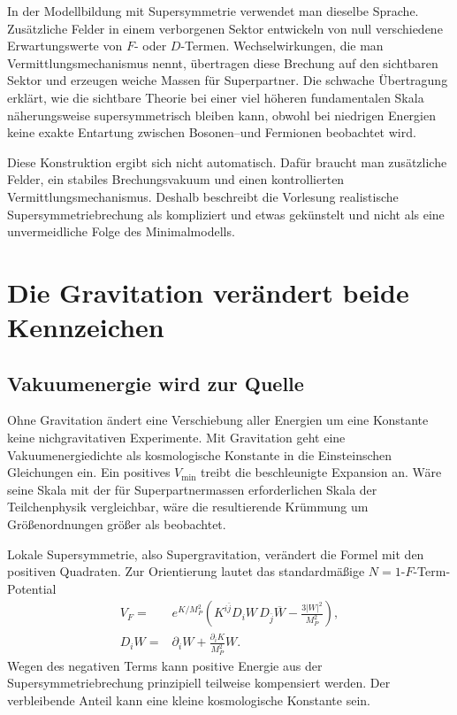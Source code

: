 In der Modellbildung mit Supersymmetrie verwendet man dieselbe Sprache. Zusätzliche Felder in einem verborgenen Sektor entwickeln von null verschiedene Erwartungswerte von \(F\)- oder \(D\)-Termen. Wechselwirkungen, die man Vermittlungsmechanismus nennt, übertragen diese Brechung auf den sichtbaren Sektor und erzeugen weiche Massen für Superpartner. Die schwache Übertragung erklärt, wie die sichtbare Theorie bei einer viel höheren fundamentalen Skala näherungsweise supersymmetrisch bleiben kann, obwohl bei niedrigen Energien keine exakte Entartung zwischen Bosonen--und Fermionen beobachtet wird.

Diese Konstruktion ergibt sich nicht automatisch. Dafür braucht man zusätzliche Felder, ein stabiles Brechungsvakuum und einen kontrollierten Vermittlungsmechanismus. Deshalb beschreibt die Vorlesung realistische Supersymmetriebrechung als kompliziert und etwas gekünstelt und nicht als eine unvermeidliche Folge des Minimalmodells.

\section{Die Gravitation verändert beide Kennzeichen}

\subsection{Vakuumenergie wird zur Quelle}

Ohne Gravitation ändert eine Verschiebung aller Energien um eine Konstante keine nichgravitativen Experimente. Mit Gravitation geht eine Vakuumenergiedichte als kosmologische Konstante in die Einsteinschen Gleichungen ein. Ein positives \(V_{\min}\) treibt die beschleunigte Expansion an. Wäre seine Skala mit der für Superpartnermassen erforderlichen Skala der Teilchenphysik vergleichbar, wäre die resultierende Krümmung um Größenordnungen größer als beobachtet.

\begin{classroomqa}
\end{classroomqa}

Lokale Supersymmetrie, also Supergravitation, verändert die Formel mit den positiven Quadraten. Zur Orientierung lautet das standardmäßige \(N=1\)-\(F\)-Term-Potential
\begin{equation}
\begin{aligned}
V_F={}&e^{K/M_P^2}
\left(
K^{i\bar j}D_iW\,D_{\bar j}\overline W
-\frac{3|W|^2}{M_P^2}
\right),\\
D_iW={}&\partial_iW+\frac{\partial_iK}{M_P^2}W.
\end{aligned}
\label{eq:l9-sugra-potential}
\end{equation}
Wegen des negativen Terms kann positive Energie aus der Supersymmetriebrechung prinzipiell teilweise kompensiert werden. Der verbleibende Anteil kann eine kleine kosmologische Konstante sein.

